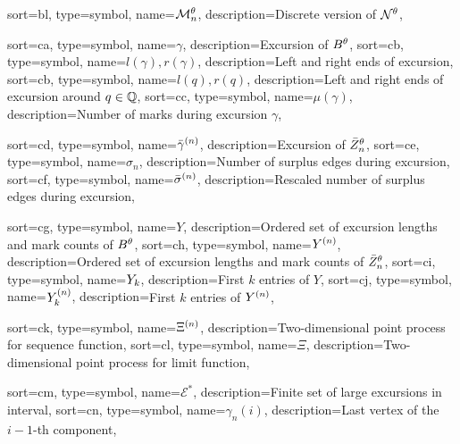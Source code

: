 {
	sort={bl},
	type=symbol,
name={$\mathcal{M}_n^{\theta}$},
description={Discrete version of $\mathcal{N}^{\theta}$, \pageref{D: Ndis}}
}






{
	sort={ca},
	type=symbol,
	name={$\gamma$},
	description={Excursion of $B^{\theta}$, \pageref{I: gamma}}
}
{
	sort={cb},
	type=symbol,
name={$l(\gamma), r(\gamma)$},
description={Left and right ends of excursion, \pageref{I: rgammalgamma}}
}
{
sort={cb},
type=symbol,
name={$l(q), r(q)$},
description={Left and right ends of excursion around $q \in \mathbb{Q}$, \pageref{E: def l(q)}}
}
{
	sort={cc},
	type=symbol,
name={$\mu(\gamma)$},
description={Number of marks during excursion $\gamma$, \pageref{I: mugamma}}
}

{
	sort={cd},
	type=symbol,
name={$\bar{\gamma}^{(n)}$},
description={Excursion of $\bar{Z}^{\theta}_n$, \pageref{L: sum rgamman}}
}
{
	sort={ce},
	type=symbol,
name={$\sigma_n$},
description={Number of surplus edges during excursion, \pageref{T: Main}}
}
{
	sort={cf},
	type=symbol,
name={$\bar{\sigma}^{(n)}$},
description={Rescaled number of surplus edges during excursion, \pageref{E: def Yn}}
}

{
	sort={cg},
	type=symbol,
name={$Y$},
description={Ordered set of excursion lengths and mark counts of $B^{\theta}$, \pageref{E: def Y}}
}
{
	sort={ch},
	type=symbol,
name={${Y}^{(n)}$},
description={Ordered set of excursion lengths and mark counts of $\bar{Z}^{\theta}_n$, \pageref{E: def Yn}}
}
{
	sort={ci},
	type=symbol,
name={${Y}_k$},
description={First $k$ entries of $Y$, \pageref{E: def Yk Ynk}}
}
{
	sort={cj},
	type=symbol,
name={${Y}^{(n)}_k$},
description={First $k$ entries of ${Y}^{(n)}$, \pageref{E: def Yk Ynk}}
}

{
	sort={ck},
	type=symbol,
	name={$\Xi^{(n)}$},
	description={Two-dimensional point process for sequence function, \pageref{L: Deterministic Lemma}}
}
{
	sort={cl},
	type=symbol,
name={$\Xi$},
description={Two-dimensional point process for limit function, \pageref{L: Deterministic Lemma}}
}

{
	sort={cm},
	type=symbol,
	name={$\mathcal{E}^*$},
	description={Finite set of large excursions in interval, \pageref{L: Deterministic Lemma}}
}
{
	sort={cn},
	type=symbol,
name={$\gamma_n(i)$},
description={Last vertex of the $i-1$-th component, \pageref{L: Lemma 8}}
}


